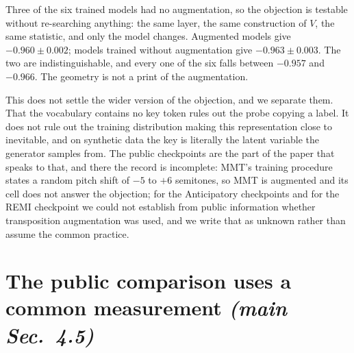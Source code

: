 \documentclass{article}
\begin{document}
Three of the six trained models had no augmentation, so the objection is testable
without re-searching anything: the same layer, the same construction of $V$, the same
statistic, and only the model changes. Augmented models give $-0.960 \pm 0.002$; models
trained without augmentation give $-0.963 \pm 0.003$. The two are indistinguishable, and
every one of the six falls between $-0.957$ and $-0.966$. The geometry is not a print of
the augmentation.

This does not settle the wider version of the objection, and we separate them. That the
vocabulary contains no key token rules out the probe copying a label. It does not rule
out the training distribution making this representation close to inevitable, and on
synthetic data the key is literally the latent variable the generator samples from. The
public checkpoints are the part of the paper that speaks to that, and there the record is
incomplete: MMT's training procedure states a random pitch shift of $-5$ to $+6$
semitones, so MMT is augmented and its cell does not answer the objection; for the
Anticipatory checkpoints and for the REMI checkpoint we could not establish from public
information whether transposition augmentation was used, and we write that as unknown
rather than assume the common practice.

\section{The public comparison uses a common measurement \normalfont\textit{(main Sec.~4.5)}}
\label{sec:public}
%
\end{document}
